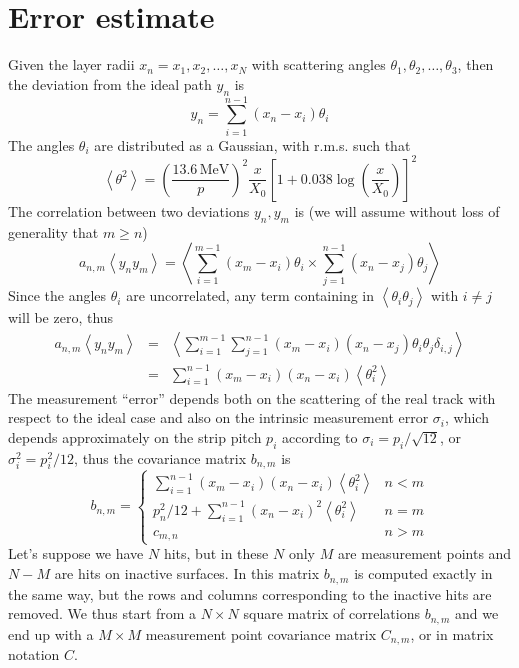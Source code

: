 \documentclass[10pt,a4paper]{article}
\begin{document}
\section{Error estimate}
Given the layer radii $x_n = x_1, x_2, \ldots, x_N$ with scattering angles $\theta_1, \theta_2, \ldots, \theta_3$, then
the deviation from the ideal path $y_n$ is
\begin{equation}
y_n=\sum_{i=1}^{n-1} \left (  x_n - x_i \right ) \theta_i
\end{equation}
The angles $\theta_i$ are distributed as a Gaussian, with r.m.s. such that
\begin{equation}
\left < \theta^2 \right > =
    \left ( \frac {13.6\,\mathrm{MeV}} {p} \right )^2
    \frac x {X_0}
    \left [ 1+ 0.038 \log \left ( \frac x {X_0} \right ) \right ] ^2
\end{equation}
The correlation between two deviations $y_n, y_m$ is (we will assume without loss of generality that $m \geq n$)
\begin{equation}
a_{n,m}\left < y_n y_m \right > =
      \left <
      \sum_{i=1}^{m-1} \left (  x_m - x_i \right ) \theta_i
      \times
      \sum_{j=1}^{n-1} \left (  x_n - x_j \right ) \theta_j
      \right >
\end{equation}
Since the angles $\theta_i$ are uncorrelated, any term containing in $\left < \theta_i \theta_j \right >$ with $i\neq j$ will be zero, thus
\begin{eqnarray}
a_{n,m}\left < y_n y_m \right > & = &
      \left <
      \sum_{i=1}^{m-1} \sum_{j=1}^{n-1}
      \left (  x_m - x_i \right )
      \left (  x_n - x_j \right ) \theta_i \theta_j \delta_{i,j}
      \right > \nonumber \\
      & = &
      \sum_{i=1}^{n-1} 
      \left (  x_m - x_i \right )
      \left (  x_n - x_i \right )  \left < \theta_i^2 \right > 
\end{eqnarray}
The measurement ``error'' depends both on the scattering of the real track with respect to the ideal case
and also on the intrinsic measurement error $\sigma_i$, which depends approximately on the strip pitch $p_i$
according to $\sigma_i = p_i / \sqrt{12}$, or $\sigma_i^2 = p_i^2 / 12$, thus the covariance matrix $b_{n,m}$ is
\begin{equation}
b_{n,m}= \left \{
\begin{array}{cl}
 \sum_{i=1}^{n-1} \left (  x_m - x_i \right ) \left (  x_n - x_i \right )  \left < \theta_i^2 \right > & n<m \\
 p_n^2 / 12 + \sum_{i=1}^{n-1} \left (  x_n - x_i \right )^2  \left < \theta_i^2 \right > & n=m \\
 c_{m,n}  & n>m
\end{array}
\right .
\end{equation}
Let's suppose we have $N$ hits, but in these $N$ only $M$ are measurement points and $N-M$ are hits
on inactive surfaces. In this matrix $b_{n,m}$ is computed exactly in the same way, but the rows
and columns corresponding to the inactive hits are removed. We thus start from a $N\times N$ square matrix
of correlations $b_{n,m}$ and we end up with a $M\times M$ measurement point covariance matrix $C_{n,m}$,
or in matrix notation $C$.


\label{LastPage}
\end{document}
